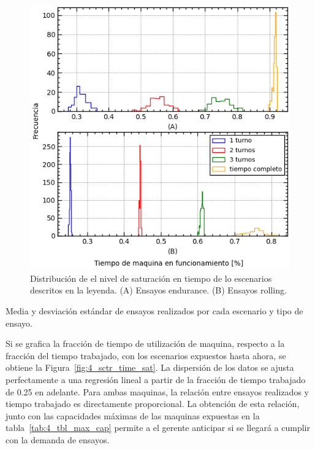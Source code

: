 \begin{figure}
	\begin{center}
		\includegraphics{fig/4_hist_time_sat}
	\end{center}
	\caption{Distribución de el nivel de saturación en tiempo de lo escenarios descritos en la leyenda.
	(A) Ensayos endurance. (B) Ensayos rolling.}
	\label{fig:4_hist_time_sat}
\end{figure}

\begin{table}
	\centering
	\caption{Media y desviación estándar de ensayos realizados por cada escenario y tipo de ensayo.}
	
	\label{tab:4_tbl_test_done}
\end{table}

Si se grafica la fracción de tiempo de utilización de maquina,
respecto a la fracción del tiempo trabajado,
con los escenarios expuestos hasta ahora,
se obtiene la Figura~\ref{fig:4_sctr_time_sat}.
La dispersión de los datos se ajusta perfectamente a una regresión lineal
a partir de la fracción de tiempo trabajado de 0.25 en adelante.
Para ambas maquinas, la relación entre ensayos realizados
y tiempo trabajado es directamente proporcional.
La obtención de esta relación,
junto con las capacidades máximas de las maquinas
expuestas en la tabla~\ref{tab:4_tbl_max_cap} permite a el gerente
anticipar si se llegará a cumplir con la demanda de ensayos.

